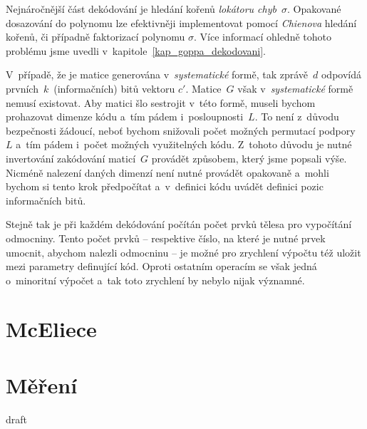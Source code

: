 \documentclass[thesis=M,czech,hidelinks]{FITthesis}[2012/06/26]
\newcommand{\0}{{\textcolor[gray]{0.75}{0}}}
\begin{document}
Nejnáročnější část dekódování je hledání kořenů \emph{lokátoru chyb}~$\sigma$.
Opakované dosazování do polynomu lze efektivněji implementovat pomocí
\emph{Chienova} hledání kořenů, či případně faktorizací polynomu $\sigma$. Více
informací ohledně tohoto problému jsme uvedli
v~kapitole~\ref{kap_goppa_dekodovani}.

V~případě, že je matice generována v~\emph{systematické} formě, tak zprávě~$d$
odpovídá prvních~$k$~(informačních) bitů vektoru $c'$. Matice~$G$ však
v~\emph{systematické} formě nemusí existovat. Aby matici šlo sestrojit v~této
formě, museli bychom prohazovat dimenze kódu a~tím pádem i~posloupnosti~$L$. To
není z~důvodu bezpečnosti žádoucí, neboť bychom snižovali počet možných
permutací podpory~$L$ a~tím pádem i~počet možných využitelných kódu. Z~tohoto
důvodu je nutné invertování zakódování maticí~$G$ provádět způsobem, který jsme
popsali výše.  Nicméně nalezení daných dimenzí není nutné provádět opakovaně
a~mohli bychom si tento krok předpočítat a~v~definici kódu uvádět definici pozic
informačních bitů.

Stejně tak je při každém dekódování počítán počet prvků tělesa pro vypočítání
odmocniny. Tento počet prvků -- respektive číslo, na které je nutné prvek umocnit,
abychom nalezli odmocninu -- je možné pro zrychlení výpočtu též uložit mezi
parametry definující kód. Oproti ostatním operacím se však jedná o~minoritní
výpočet a~tak toto zrychlení by nebylo nijak významné.


\clearpage

\section{McEliece}



\section{Měření}




\begin{conclusion}
    draft \cite{Schanck}
\end{conclusion}
\end{document}
